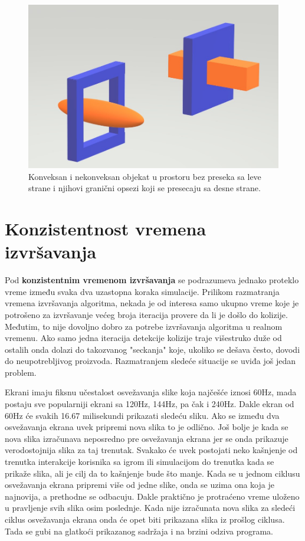 \documentclass[12pt,oneside]{memoir}
\begin{document}
\begin{figure}[h!]
	\centering
	\includegraphics[scale=0.5]{falseCollision.jpg}
	\caption{Konveksan i nekonveksan objekat u prostoru bez preseka sa leve strane i
	njihovi granični opsezi koji se presecaju sa desne strane. }
	\label{fig:falseCollision}
\end{figure}


\section{Konzistentnost vremena izvršavanja}

Pod \textbf{konzistentnim vremenom izvršavanja} se podrazumeva jednako proteklo vreme između svaka dva uzastopna koraka simulacije.
Prilikom razmatranja vremena izvršavanja algoritma, nekada je od interesa 
samo ukupno vreme koje je potrošeno za izvršavanje većeg broja iteracija provere da li je došlo do kolizije. 
Međutim, to nije dovoljno dobro za potrebe izvršavanja algoritma u realnom vremenu.
Ako samo jedna iteracija 
detekcije kolizije traje višestruko duže od ostalih onda dolazi do takozvanog "seckanja"
koje, ukoliko se dešava često, dovodi do neupotrebljivog proizvoda.
Razmatranjem sledeće situacije se uviđa još jedan problem.

Ekrani imaju fiksnu učestalost osvežavanja slike koja najčešće iznosi 60Hz, mada postaju sve popularniji
ekrani sa 120Hz, 144Hz, pa čak i 240Hz. Dakle ekran od 60Hz će svakih 16.67 milisekundi prikazati sledeću sliku. 
Ako se između dva osvežavanja ekrana uvek pripremi nova slika to je odlično. 
Još bolje je kada se nova slika izračunava neposredno pre osvežavanja ekrana jer se onda 
prikazuje verodostojnija slika za taj trenutak. 
Svakako će uvek postojati neko kašnjenje od trenutka interakcije korisnika sa igrom ili simulacijom do
trenutka kada se prikaže slika, ali je cilj da to kašnjenje bude što manje. 
Kada se u jednom ciklusu osvežavanja ekrana pripremi više od jedne slike, onda se uzima ona koja je najnovija,
a prethodne se odbacuju. 
Dakle praktično je protraćeno vreme uloženo u pravljenje svih slika osim poslednje.
Kada nije izračunata nova slika za sledeći ciklus osvežavanja ekrana onda će opet biti prikazana slika
iz prošlog ciklusa. Tada se gubi na glatkoći prikazanog sadržaja i na brzini odziva programa. 
\end{document}
